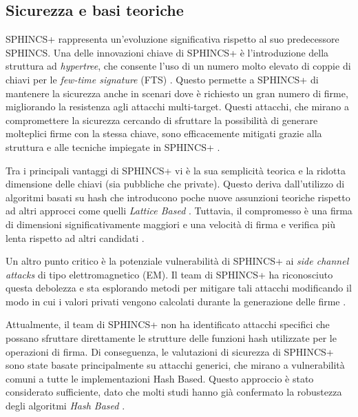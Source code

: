 \subsection{Sicurezza e basi teoriche}

SPHINCS+ rappresenta un'evoluzione significativa rispetto al suo predecessore SPHINCS. Una delle innovazioni chiave di SPHINCS+ è l'introduzione della struttura ad \textit{hypertree}, che consente l'uso di un numero molto elevato di coppie di chiavi per le \textit{few-time signature} (FTS) \cite{sphincs-changelog-round-three}. Questo permette a SPHINCS+ di mantenere la sicurezza anche in scenari dove è richiesto un gran numero di firme, migliorando la resistenza agli attacchi multi-target. Questi attacchi, che mirano a compromettere la sicurezza cercando di sfruttare la possibilità di generare molteplici firme con la stessa chiave, sono efficacemente mitigati grazie alla struttura e alle tecniche impiegate in SPHINCS+ \cite{sphincs-presentation-paper}.

Tra i principali vantaggi di SPHINCS+ vi è la sua semplicità teorica e la ridotta dimensione delle chiavi (sia pubbliche che private). Questo deriva dall'utilizzo di algoritmi basati su hash che introducono poche nuove assunzioni teoriche rispetto ad altri approcci come quelli \textit{Lattice Based} \cite{sphincs-submissionpackage-three}. Tuttavia, il compromesso è una firma di dimensioni significativamente maggiori e una velocità di firma e verifica più lenta rispetto ad altri candidati \cite{sphincs-ieee-paper}.

Un altro punto critico è la potenziale vulnerabilità di SPHINCS+ ai \textit{side channel attacks} di tipo elettromagnetico (EM). Il team di SPHINCS+ ha riconosciuto questa debolezza e sta esplorando metodi per mitigare tali attacchi modificando il modo in cui i valori privati vengono calcolati durante la generazione delle firme \cite{sphincs-changelog-round-three}.

Attualmente, il team di SPHINCS+ non ha identificato attacchi specifici che possano sfruttare direttamente le strutture delle funzioni hash utilizzate per le operazioni di firma. Di conseguenza, le valutazioni di sicurezza di SPHINCS+ sono state basate principalmente su attacchi generici, che mirano a vulnerabilità comuni a tutte le implementazioni Hash Based. Questo approccio è stato considerato sufficiente, dato che molti studi hanno già confermato la robustezza degli algoritmi \textit{Hash Based} \cite{sphincs-submissionpackage-three}.

